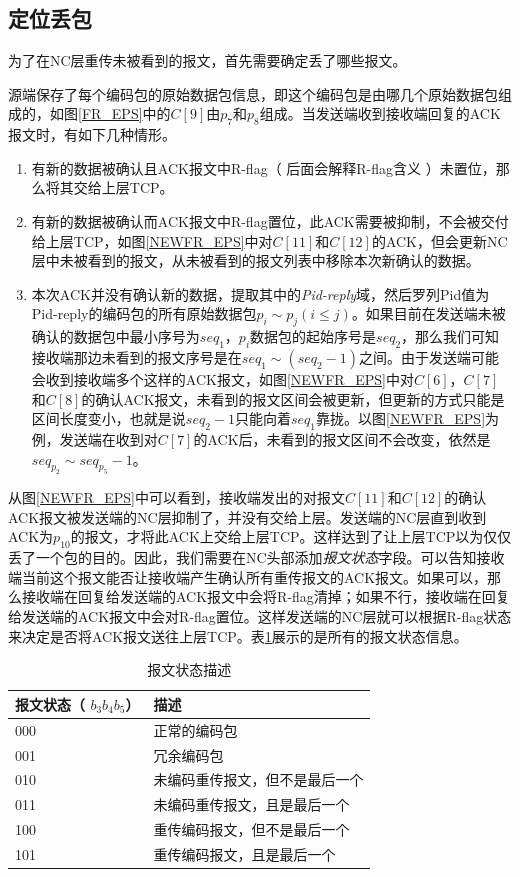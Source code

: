 \subsection{定位丢包}
为了在NC层重传未被看到的报文，首先需要确定丢了哪些报文。
\par
源端保存了每个编码包的原始数据包信息，即这个编码包是由哪几个原始数据包组成的，如图\ref{FR_EPS}中的$C\left[9\right]$由$p_7$和$p_8$组成。当发送端收到接收端回复的ACK报文时，有如下几种情形。
\begin{enumerate}[fullwidth,itemindent=2em,label=(\arabic*)]
	\item 有新的数据被确认且ACK报文中R-flag（ 后面会解释R-flag含义 ）未置位，那么将其交给上层TCP。
	\item 有新的数据被确认而ACK报文中R-flag置位，此ACK需要被抑制，不会被交付给上层TCP，如图\ref{NEWFR_EPS}中对$C\left[11\right]$和$C\left[12\right]$的ACK，但会更新NC层中未被看到的报文，从未被看到的报文列表中移除本次新确认的数据。
	\item 本次ACK并没有确认新的数据，提取其中的\emph{Pid-reply}域，然后罗列Pid值为Pid-reply的编码包的所有原始数据包$p_i \sim p_j(i \le j)$。如果目前在发送端未被确认的数据包中最小序号为$seq_1$，$p_i$数据包的起始序号是$seq_2$，那么我们可知接收端那边未看到的报文序号是在$seq_1 \sim \left(seq_2 - 1\right)$之间。由于发送端可能会收到接收端多个这样的ACK报文，如图\ref{NEWFR_EPS}中对$C\left[6\right]$，$C\left[7\right]$和$C\left[8\right]$的确认ACK报文，未看到的报文区间会被更新，但更新的方式只能是区间长度变小，也就是说$seq_2-1$只能向着$seq_1$靠拢。以图\ref{NEWFR_EPS}为例，发送端在收到对$C\left[7\right]$的ACK后，未看到的报文区间不会改变，依然是$seq_{p_2} \sim seq_{p_5} - 1$。
\end{enumerate}
\par
从图\ref{NEWFR_EPS}中可以看到，接收端发出的对报文$C\left[11\right]$和$C\left[12\right]$的确认ACK报文被发送端的NC层抑制了，并没有交给上层。发送端的NC层直到收到ACK为$p_{10}$的报文，才将此ACK上交给上层TCP。这样达到了让上层TCP以为仅仅丢了一个包的目的。因此，我们需要在NC头部添加\emph{报文状态}字段。可以告知接收端当前这个报文能否让接收端产生确认所有重传报文的ACK报文。如果可以，那么接收端在回复给发送端的ACK报文中会将R-flag清掉；如果不行，接收端在回复给发送端的ACK报文中会对R-flag置位。这样发送端的NC层就可以根据R-flag状态来决定是否将ACK报文送往上层TCP。表\ref{tab:BWZT}展示的是所有的报文状态信息。

\begin{table}[htp]
	\centering
	\caption{报文状态描述}
	\label{tab:BWZT}
	\begin{tabular}{l|l}
		\toprule
		报文状态（ $b_3b_4b_5$） &描述\tabularnewline
		\midrule
		000		& 正常的编码包\tabularnewline
		001		& 冗余编码包 \tabularnewline
		010		& 未编码重传报文，但不是最后一个\tabularnewline
		011 	& 未编码重传报文，且是最后一个\tabularnewline
		100		& 重传编码报文，但不是最后一个\tabularnewline
		101		& 重传编码报文，且是最后一个\tabularnewline
		\bottomrule
	\end{tabular}
\end{table}
